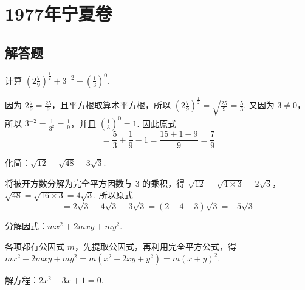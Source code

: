 
\chapter{1977年宁夏卷}

\section{解答题}

\begin{problem}
计算 \(\left(2\frac{7}{9}\right)^{\frac{1}{2}}+3^{-2}-\left(\frac{1}{3}\right)^{0}\).
\end{problem}

\begin{solution}
因为 \(2\frac{7}{9}=\frac{25}{9}\)，且平方根取算术平方根，所以 \(\left(2\frac{7}{9}\right)^{\frac{1}{2}}=\sqrt{\frac{25}{9}}=\frac{5}{3}\). 又因为 \(3\neq0\)，所以 \(3^{-2}=\frac{1}{3^{2}}=\frac{1}{9}\)，并且 \(\left(\frac{1}{3}\right)^{0}=1\). 因此原式
\[
=\frac{5}{3}+\frac{1}{9}-1=\frac{15+1-9}{9}=\frac{7}{9}
\]
\end{solution}

\begin{problem}
化简：\(\sqrt{12}-\sqrt{48}-3\sqrt{3}\).
\end{problem}

\begin{solution}
将被开方数分解为完全平方因数与 \(3\) 的乘积，得 \(\sqrt{12}=\sqrt{4\times3}=2\sqrt{3}\)，\(\sqrt{48}=\sqrt{16\times3}=4\sqrt{3}\). 所以原式
\[
=2\sqrt{3}-4\sqrt{3}-3\sqrt{3}=(2-4-3)\sqrt{3}=-5\sqrt{3}
\]
\end{solution}

\begin{problem}
分解因式：\(mx^{2}+2mxy+my^{2}\).
\end{problem}

\begin{solution}
各项都有公因式 \(m\)，先提取公因式，再利用完全平方公式，得 \(mx^{2}+2mxy+my^{2}=m\left(x^{2}+2xy+y^{2}\right)=m\left(x+y\right)^{2}\).
\end{solution}

\begin{problem}
解方程：\(2x^{2}-3x+1=0\).
\end{problem}

